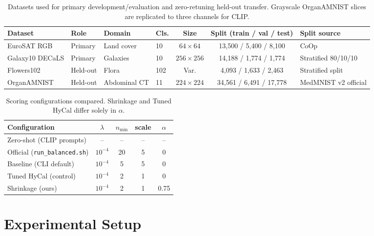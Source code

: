 \documentclass[letterpaper]{article} %
\newcommand{\nmin}{n_{\min}}
\begin{document}
\begin{table}[t]
\centering
\footnotesize
\setlength{\tabcolsep}{3pt}
\begin{tabular}{@{}llllccl@{}}
\toprule
Dataset & Role & Domain & Cls. & Size & Split (train / val / test) & Split source \\
\midrule
EuroSAT RGB \citep{helber2019eurosat} & Primary & Land cover & 10 & $64{\times}64$ & 13,500 / 5,400 / 8,100 & CoOp \citep{zhou2022coop} \\
Galaxy10 DECaLS \citep{galaxy10} & Primary & Galaxies & 10 & $256{\times}256$ & 14,188 / 1,774 / 1,774 & Stratified 80/10/10 \\
Flowers102 \citep{nilsback2008flowers} & Held-out & Flora & 102 & Var. & 4,093 / 1,633 / 2,463 & Stratified split \\
OrganAMNIST \citep{yang2023medmnist} & Held-out & Abdominal CT & 11 & $224{\times}224$ & 34,561 / 6,491 / 17,778 & MedMNIST v2 official \\
\bottomrule
\end{tabular}
\caption{Datasets used for primary development/evaluation and zero-retuning held-out transfer. Grayscale OrganAMNIST slices are replicated to three channels for CLIP.}
\label{tab:data}
\end{table}

\begin{table}[t]
\centering
\small
\setlength{\tabcolsep}{4pt}
\begin{tabular}{@{}lcccc@{}}
\toprule
Configuration & $\lambda$ & $\nmin$ & scale & $\alpha$ \\
\midrule
Zero-shot (CLIP prompts) & -- & -- & -- & -- \\
Official (\texttt{run\_balanced.sh}) & $10^{-4}$ & 20 & 5 & 0 \\
Baseline (CLI default) & $10^{-4}$ & 5 & 5 & 0 \\
Tuned HyCal (control) & $10^{-4}$ & 2 & 1 & 0 \\
Shrinkage (ours) & $10^{-4}$ & 2 & 1 & 0.75 \\
\bottomrule
\end{tabular}
\caption{Scoring configurations compared. Shrinkage and Tuned HyCal differ solely in $\alpha$.}
\label{tab:configs}
\end{table}

\section{Experimental Setup}
\end{document}
